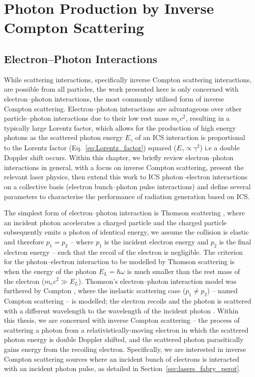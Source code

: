 \documentclass[../main.tex]{subfiles}
\begin{document}
\chapter{Photon Production by Inverse Compton Scattering}
\label{Photon_Production_by_Inverse_Compton_Scattering} %

\section{Electron--Photon Interactions}
\label{sec:electron_photon_interactions}

While scattering interactions, specifically inverse Compton scattering interactions, are possible from all particles, the work presented here is only concerned with electron--photon interactions, the most commonly utilised form of inverse Compton scattering.  Electron--photon interactions are advantageous over other particle--photon interactions due to their low rest mass $m_{e}c^{2}$, resulting in a typically large Lorentz factor, which allows for the production of high energy photons as the scattered photon energy $E_{\gamma}$ of an ICS interaction is proportional to the Lorentz factor (Eq.~\ref{eq:Lorentz_factor}) squared ($E_{\gamma}\propto\gamma^{2}$) i.e a double Doppler shift occurs. Within this chapter, we briefly review electron--photon interactions in general, with a focus on inverse Compton scattering, present the relevant laser physics, then extend this work to ICS photon--electron interactions on a collective basis (electron bunch--photon pulse interactions) and define several parameters to characterise the performance of radiation generation based on ICS.   

The simplest form of electron--photon interaction is Thomson scattering \cite{thomson1904xxxiv}, where an incident photon accelerates a charged particle and the charged particle subsequently emits a photon of identical energy, we assume the collision is elastic and therefore $p_{1} = p_{2}$ -- where $p_{1}$ is the incident electron energy and $p_{2}$ is the final electron energy -- such that the recoil of the electron is negligible. The criterion for the photon--electron interaction to be modelled by Thomson scattering is when the energy of the photon $E_{L}=\hbar\omega$ is much smaller than the rest mass of the electron ($m_{e}c^{2}\gg E_{L}$). Thomson's electron--photon interaction model was furthered by Compton \cite{compton1923quantum}, where the inelastic scattering case ($p_{1} \neq p_{2}$) -- named Compton scattering -- is modelled; the electron recoils and the photon is scattered with a different wavelength to the wavelength of the incident photon . Within this thesis, we are concerned with inverse Compton scattering -- the process of scattering a photon from a relativistically-moving electron in which the scattered photon energy is double Doppler shifted, and the scattered photon parasitically gains energy from the recoiling electron. Specifically, we are interested in inverse Compton scattering sources where an incident bunch of electrons is interacted with an incident photon pulse, as detailed in Section~\ref{sec:lasers_fabry_perot}. 
\end{document}
